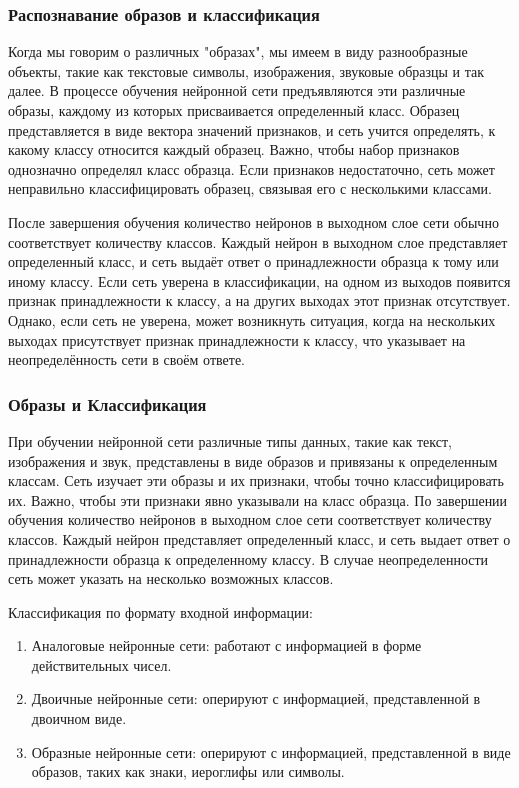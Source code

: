 \subsubsection{Распознавание образов и классификация}
Когда мы говорим о различных "образах", мы имеем в виду разнообразные объекты, такие как текстовые символы, изображения, звуковые образцы и так далее. В процессе обучения нейронной сети предъявляются эти различные образы, каждому из которых присваивается определенный класс. Образец представляется в виде вектора значений признаков, и сеть учится определять, к какому классу относится каждый образец. Важно, чтобы набор признаков однозначно определял класс образца. Если признаков недостаточно, сеть может неправильно классифицировать образец, связывая его с несколькими классами.

После завершения обучения количество нейронов в выходном слое сети обычно соответствует количеству классов. Каждый нейрон в выходном слое представляет определенный класс, и сеть выдаёт ответ о принадлежности образца к тому или иному классу. Если сеть уверена в классификации, на одном из выходов появится признак принадлежности к классу, а на других выходах этот признак отсутствует. Однако, если сеть не уверена, может возникнуть ситуация, когда на нескольких выходах присутствует признак принадлежности к классу, что указывает на неопределённость сети в своём ответе.

\subsubsection{Образы и Классификация}
При обучении нейронной сети различные типы данных, такие как текст, изображения и звук, представлены в виде образов и привязаны к определенным классам. Сеть изучает эти образы и их признаки, чтобы точно классифицировать их. Важно, чтобы эти признаки явно указывали на класс образца. По завершении обучения количество нейронов в выходном слое сети соответствует количеству классов. Каждый нейрон представляет определенный класс, и сеть выдает ответ о принадлежности образца к определенному классу. В случае неопределенности сеть может указать на несколько возможных классов.

Классификация по формату входной информации:
\begin{enumerate}
\item Аналоговые нейронные сети: работают с информацией в форме действительных чисел.
\item Двоичные нейронные сети: оперируют с информацией, представленной в двоичном виде.
\item Образные нейронные сети: оперируют с информацией, представленной в виде образов, таких как знаки, иероглифы или символы.
\end{enumerate}

